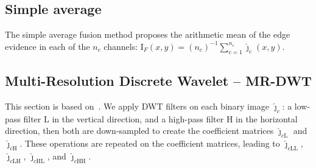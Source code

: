 \documentclass[journal]{IEEEtran}
\begin{document}

\subsection{Simple average}
The simple average fusion method proposes the arithmetic mean of the edge evidence in each of the $n_c$ channels:
$\text{I}_F(x,y)=(n_c)^{-1}\sum_{c=1}^{n_c} \widehat{\bm\jmath}_c(x,y)$.

\subsection{Multi-Resolution Discrete Wavelet -- MR-DWT} 
This section is based on~\cite{n_r}.
We apply DWT filters on each binary image $\bm{\widehat\jmath}_c$: a low-pass filter $\text{L}$ in the vertical direction, and a high-pass filter $\text{H}$ in the horizontal direction, then both are down-sampled to create the coefficient matrices $\bm{\widehat\jmath}_{c\text{L}}$ and $\bm{\widehat\jmath}_{c\text{H}}$.
These operations are repeated on the coefficient matrices, leading to $\bm{\widehat\jmath}_{c\text{LL}}$, $\bm{\widehat\jmath}_{c\text{LH}}$, $\bm{\widehat\jmath}_{c\text{HL}}$, and $\bm{\widehat\jmath}_{c\text{HH}}$.
\end{document}
